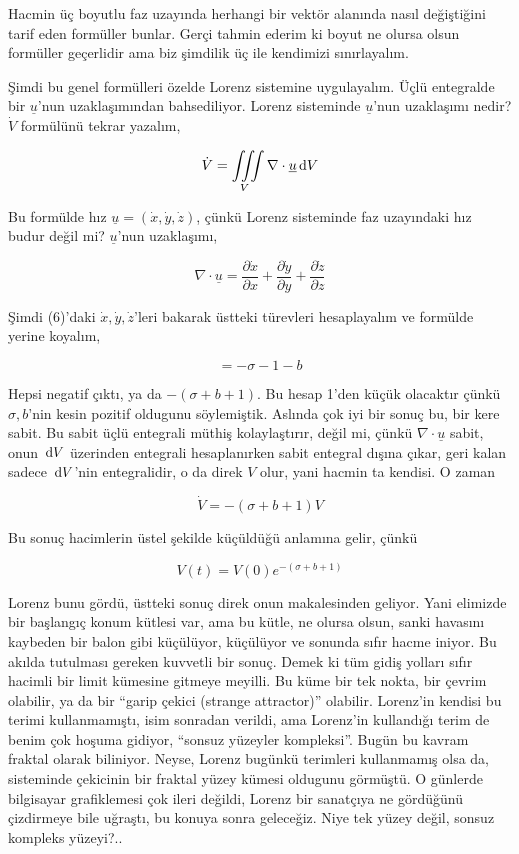 \documentclass[12pt,fleqn]{article}\usepackage{../../common}
\begin{document}
Hacmin üç boyutlu faz uzayında herhangi bir vektör alanında nasıl
değiştiğini tarif eden formüller bunlar. Gerçi tahmin ederim ki boyut ne
olursa olsun formüller geçerlidir ama biz şimdilik üç ile kendimizi
sınırlayalım. 

Şimdi bu genel formülleri özelde Lorenz sistemine uygulayalım. Üçlü
entegralde bir $\underline{u}$'nun uzaklaşımından bahsediliyor. Lorenz
sisteminde $\underline{u}$'nun uzaklaşımı nedir? $\dot{V}$ formülünü tekrar
yazalım,

$$ 
\dot{V} = \iiint\limits_V \nabla \cdot \underline{u} \,\mathrm{d} V
$$

Bu formülde hız $\underline{u} = (\dot{x}, \dot{y}, \dot{z})$, çünkü Lorenz
sisteminde faz uzayındaki hız budur değil mi? $\underline{u}$'nun
uzaklaşımı,

$$ 
\nabla \cdot \underline{u} = 
\frac{\partial \dot{x}}{\partial x} + 
\frac{\partial \dot{y}}{\partial y} + 
\frac{\partial \dot{z}}{\partial z} 
$$

Şimdi (6)'daki $\dot{x}, \dot{y}, \dot{z}$'leri bakarak üstteki türevleri
hesaplayalım ve formülde yerine koyalım,

$$ = -\sigma -1 - b$$

Hepsi negatif çıktı, ya da $-(\sigma+b+1)$. Bu hesap 1'den küçük olacaktır
çünkü $\sigma,b$'nin kesin pozitif oldugunu söylemiştik. Aslında çok iyi
bir sonuç bu, bir kere sabit. Bu sabit üçlü entegrali müthiş kolaylaştırır,
değil mi, çünkü $\nabla \cdot \underline{u}$ sabit, onun $\,\mathrm{d} V$ üzerinden
entegrali hesaplanırken sabit entegral dışına çıkar, geri kalan sadece
$\,\mathrm{d} V$'nin entegralidir, o da direk $V$ olur, yani hacmin ta kendisi. O
zaman

$$ \dot{V} = -(\sigma + b + 1) V$$

Bu sonuç hacimlerin üstel şekilde küçüldüğü anlamına gelir, çünkü

$$ V(t) = V(0) e^{-(\sigma + b + 1)}$$

Lorenz bunu gördü, üstteki sonuç direk onun makalesinden geliyor. Yani
elimizde bir başlangıç konum kütlesi var, ama bu kütle, ne olursa olsun,
sanki havasını kaybeden bir balon gibi küçülüyor, küçülüyor ve sonunda
sıfır hacme iniyor. Bu akılda tutulması gereken kuvvetli bir sonuç. Demek
ki tüm gidiş yolları sıfır hacimli bir limit kümesine gitmeye meyilli. Bu
küme bir tek nokta, bir çevrim olabilir, ya da bir ``garip çekici (strange
attractor)'' olabilir. Lorenz'in kendisi bu terimi kullanmamıştı, isim
sonradan verildi, ama Lorenz'in kullandığı terim de benim çok hoşuma
gidiyor, ``sonsuz yüzeyler kompleksi''. Bugün bu kavram fraktal olarak
biliniyor. Neyse, Lorenz bugünkü terimleri kullanmamış olsa da, sisteminde
çekicinin bir fraktal yüzey kümesi oldugunu görmüştü. O günlerde bilgisayar
grafiklemesi çok ileri değildi, Lorenz bir sanatçıya ne gördüğünü
çizdirmeye bile uğraştı, bu konuya sonra geleceğiz. Niye tek yüzey değil,
sonsuz kompleks yüzeyi?..
\end{document}
